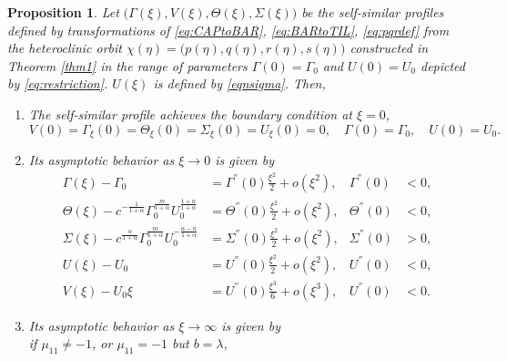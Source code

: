 \documentclass[11pt]{article}
\newtheorem{proposition}{Proposition}[section]
\theoremstyle{remark}
\begin{document}
%
%
\begin{proposition} \label{prop:ss}
Let $\big(\Gamma(\xi),V(\xi),\Theta(\xi),\Sigma(\xi)\big)$ be the self-similar profiles defined by transformations of \eqref{eq:CAPtoBAR}, \eqref{eq:BARtoTIL}, \eqref{eq:pqrdef}
from the heteroclinic orbit $\chi(\eta)=\big(p(\eta),q(\eta),r(\eta),s(\eta)\big)$ constructed in Theorem \ref{thm1} in the range of  parameters $\Gamma(0)=\Gamma_0$ and $U(0)=U_0$
depicted by \eqref{eq:restriction}. $U(\xi)$ is defined by \eqref{eqnsigma}. Then,
 \begin{enumerate}
  \item[(i)] The self-similar profile achieves the boundary condition at $\xi=0$,
    \begin{equation*}
    {V}(0) = \Gamma_\xi(0) = \Theta_\xi(0)=\Sigma_\xi(0) = {U}_\xi(0)=0, \quad \Gamma(0)=\Gamma_0, \quad U(0)=U_0.
  \end{equation*}
  \item[(ii)] Its asymptotic behavior as $\xi \rightarrow 0$ is given by
  \begin{equation} \label{eq:ss_asymp0}
  \begin{aligned}
    \Gamma(\xi) -\Gamma_0 &= \Gamma^{''}(0)\frac{\xi^2}{2} + o(\xi^2), & \Gamma^{''}(0)&<0,\\
    \Theta(\xi) - c^{-\frac{1}{1+\alpha}}\Gamma_0^{\frac{m}{1+\alpha}} U_0^{\frac{1+n}{1+\alpha}} &= \Theta^{''}(0)\frac{\xi^2}{2} + o(\xi^2), & \Theta^{''}(0)&<0,\\
    \Sigma(\xi) - c^{\frac{\alpha}{1+\alpha}}\Gamma_0^{\frac{m}{1+\alpha}} U_0^{-\frac{\alpha-n}{1+\alpha}} &= \Sigma^{''}(0)\frac{\xi^2}{2} + o(\xi^2), & \Sigma^{''}(0)&>0, \\
    U(\xi) - U_0 &= U^{''}(0)\frac{\xi^2}{2} + o(\xi^2), & U^{''}(0)&<0,\\
    V(\xi) - U_0\xi &= U^{''}(0)\frac{\xi^3}{6} + o(\xi^3), & U^{''}(0)&<0.
  \end{aligned}
  \end{equation}
  \item[(iii)] Its asymptotic behavior as $\xi \rightarrow \infty$ is given by\\
  if $\mu_{11}\ne-1$, or $\mu_{11}=-1$ but $b=\lambda$,

\end{enumerate}
\end{proposition}
\end{document}

